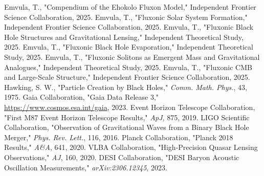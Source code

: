 \documentclass[11pt]{article}
\begin{document}



\begin{thebibliography}{9}
Emvula, T., "Compendium of the Ehokolo Fluxon Model," Independent Frontier Science Collaboration, 2025.
Emvula, T., "Fluxonic Solar System Formation," Independent Frontier Science Collaboration, 2025.
Emvula, T., "Fluxonic Black Hole Structures and Gravitational Lensing," Independent Theoretical Study, 2025.
Emvula, T., "Fluxonic Black Hole Evaporation," Independent Theoretical Study, 2025.
Emvula, T., "Fluxonic Solitons as Emergent Mass and Gravitational Analogues," Independent Theoretical Study, 2025.
Emvula, T., "Fluxonic CMB and Large-Scale Structure," Independent Frontier Science Collaboration, 2025.
Hawking, S. W., "Particle Creation by Black Holes," \textit{Comm. Math. Phys.}, 43, 1975.
Gaia Collaboration, "Gaia Data Release 3," \url{https://www.cosmos.esa.int/gaia}, 2023.
Event Horizon Telescope Collaboration, "First M87 Event Horizon Telescope Results," \textit{ApJ}, 875, 2019.
LIGO Scientific Collaboration, "Observation of Gravitational Waves from a Binary Black Hole Merger," \textit{Phys. Rev. Lett.}, 116, 2016.
Planck Collaboration, "Planck 2018 Results," \textit{A\&A}, 641, 2020.
VLBA Collaboration, "High-Precision Quasar Lensing Observations," \textit{AJ}, 160, 2020.
DESI Collaboration, "DESI Baryon Acoustic Oscillation Measurements," \textit{arXiv:2306.12345}, 2023.
\end{thebibliography}
\end{document}
